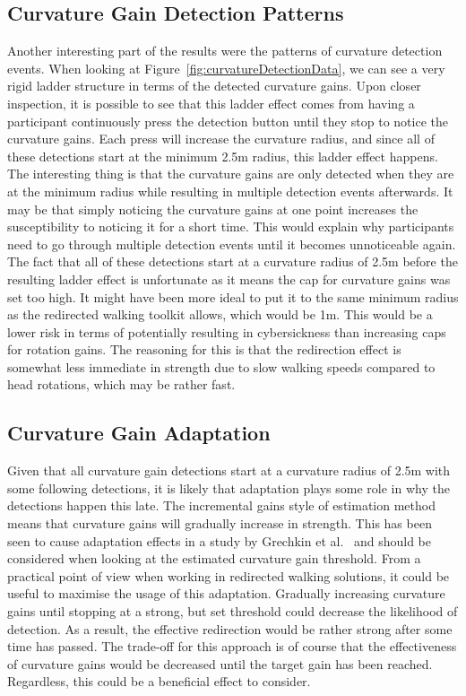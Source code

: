\subsection{Curvature Gain Detection Patterns}
Another interesting part of the results were the patterns of curvature detection events. When looking at Figure~\ref{fig:curvatureDetectionData}, we can see a very rigid ladder structure in terms of the detected curvature gains. Upon closer inspection, it is possible to see that this ladder effect comes from having a participant continuously press the detection button until they stop to notice the curvature gains. Each press will increase the curvature radius, and since all of these detections start at the minimum 2.5m radius, this ladder effect happens. The interesting thing is that the curvature gains are only detected when they are at the minimum radius while resulting in multiple detection events afterwards. It may be that simply noticing the curvature gains at one point increases the susceptibility to noticing it for a short time. This would explain why participants need to go through multiple detection events until it becomes unnoticeable again. The fact that all of these detections start at a curvature radius of 2.5m before the resulting ladder effect is unfortunate as it means the cap for curvature gains was set too high. It might have been more ideal to put it to the same minimum radius as the redirected walking toolkit allows, which would be 1m. This would be a lower risk in terms of potentially resulting in cybersickness than increasing caps for rotation gains. The reasoning for this is that the redirection effect is somewhat less immediate in strength due to slow walking speeds compared to head rotations, which may be rather fast. 

\subsection{Curvature Gain Adaptation}
Given that all curvature gain detections start at a curvature radius of 2.5m with some following detections, it is likely that adaptation plays some role in why the detections happen this late. The incremental gains style of estimation method means that curvature gains will gradually increase in strength. This has been seen to cause adaptation effects in a study by Grechkin et al.~\cite{grechkin2016revisiting} and should be considered when looking at the estimated curvature gain threshold. From a practical point of view when working in redirected walking solutions, it could be useful to maximise the usage of this adaptation. Gradually increasing curvature gains until stopping at a strong, but set threshold could decrease the likelihood of detection. As a result, the effective redirection would be rather strong after some time has passed. The trade-off for this approach is of course that the effectiveness of curvature gains would be decreased until the target gain has been reached. Regardless, this could be a beneficial effect to consider.


